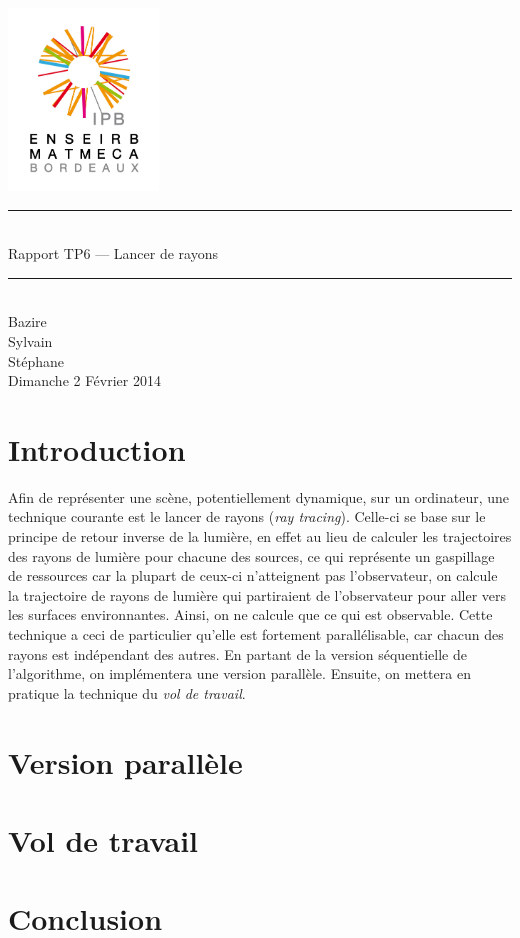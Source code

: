 \documentclass[a4paper,11pt]{article}
\begin{document}
\begin{titlepage}
  \begin{center}

    \begin{center}
      \includegraphics[width=4cm]{EM.jpg}
    \end{center}

    \vspace*{1cm}
        
    \rule{0.75\linewidth}{0.7mm}\\[0.4cm]
    {\Huge Rapport TP6 --- Lancer de rayons\\[0.4cm]}
    \rule{0.75\linewidth}{0.7mm} \\[1.5cm]

    {\Large Bazire \\Sylvain {}\\Stéphane \\[2cm]}
    {\Large Dimanche 2 Février 2014}
  \end{center}
\end{titlepage}

\tableofcontents
\clearpage
\section{Introduction}

Afin de représenter une scène, potentiellement dynamique, sur un ordinateur, une technique courante est le lancer de rayons (\emph{ray tracing}). Celle-ci se base sur le principe de retour inverse de la lumière, en effet au lieu de calculer les trajectoires des rayons de lumière pour chacune des sources, ce qui représente un gaspillage de ressources car la plupart de ceux-ci n'atteignent pas l'observateur, on calcule la trajectoire de rayons de lumière qui partiraient de l'observateur pour aller vers les surfaces environnantes. Ainsi, on ne calcule que ce qui est observable. Cette technique a ceci de particulier qu'elle est fortement parallélisable, car chacun des rayons est indépendant des autres. En partant de la version séquentielle de l'algorithme, on implémentera une version parallèle. Ensuite, on mettera en pratique la technique du \emph{vol de travail}.

\section{Version parallèle}


\section{Vol de travail}


\section{Conclusion}
\end{document}
